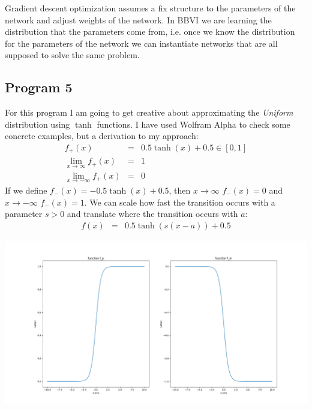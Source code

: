 \documentclass[]{article}
\begin{document}
Gradient descent optimization assumes a fix structure to the parameters of the network and adjust weights of the network. In BBVI we are learning the distribution that the parameters come from, i.e. once we know the distribution for the parameters of the network we can instantiate networks that are all supposed to solve the same problem. 
\subsection{Program 5}
For this program I am going to get creative about approximating the \emph{Uniform} distribution using $\tanh$ functions. I have used Wolfram Alpha to check some concrete examples, but a derivation to my approach:
\begin{equation}\begin{array}{rcl}
 f_{+}(x) &=& 0.5\tanh(x) + 0.5 \in [0,1] \\
 \lim_{x\rightarrow \infty} f_{+}(x) &=& 1 \\
 \lim_{x\rightarrow -\infty} f_{+}(x) &=& 0
\end{array}\end{equation}
If we define $f_{-}(x) = -0.5\tanh(x) + 0.5$, then $x\rightarrow \infty$ $f_{-}(x) =0$ and $x\rightarrow -\infty$ $f_{-}(x) = 1$. We can scale how fast the transition occurs with a parameter $s>0$ and translate where the transition occurs with $a$:
\begin{equation}\begin{array}{rcl}
 f(x) &=& 0.5\tanh(s(x-a)) + 0.5
\end{array}
\end{equation}
\begin{center}
	\includegraphics[width=\linewidth]{Figures/tanhFuncs.png}
\end{center}
\end{document}
